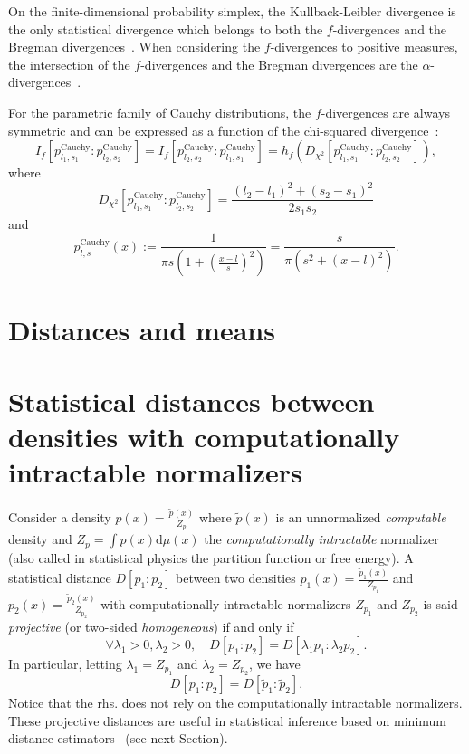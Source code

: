 \documentclass[11pt]{article}
\def\dmu{\mathrm{d}\mu}
\def\dmu{\mathrm{d}\mu}
\def\Cauchy{\mathrm{Cauchy}}
\begin{document}
On the finite-dimensional probability simplex, the Kullback-Leibler divergence is the only statistical divergence which belongs to both the $f$-divergences and the Bregman divergences~\cite{AlphaUnique-2009}. When considering the $f$-divergences to positive measures, the intersection of the $f$-divergences and the Bregman divergences are the $\alpha$-divergences~\cite{AlphaUnique-2009}. 

For the parametric family of Cauchy distributions, the $f$-divergences are always symmetric and can be expressed as a function of the chi-squared divergence~\cite{fdivCauchy-2021}:
$$
I_f[p_{l_1,s_1}^\Cauchy:p_{l_2,s_2}^\Cauchy]=I_f[p_{l_2,s_2}^\Cauchy:p_{l_1,s_1}^\Cauchy]=h_f(D_{\chi^2}[p_{l_1,s_1}^\Cauchy:p_{l_2,s_2}^\Cauchy]),
$$
where
$$
D_{\chi^2}[p_{l_1,s_1}^\Cauchy:p_{l_2,s_2}^\Cauchy]=\frac{(l_2-l_1)^2+(s_2-s_1)^2}{2s_1s_2}
$$
and
$$
p_{l,s}^\Cauchy(x) := \frac{1}{\pi s\left(1+\left(\frac{x-l}{s}\right)^2\right)}=\frac{s}{\pi (s^2+(x-l)^2)}.
$$


\section{Distances and means}



\section{Statistical distances between densities with computationally intractable normalizers}

Consider a density $p(x)=\frac{\tilde p(x)}{Z_p}$ where $\tilde p(x)$ is an unnormalized {\em computable} density 
and $Z_p=\int p(x) \dmu(x)$ the {\em computationally intractable} normalizer (also called in statistical physics the partition function or free energy).
A statistical distance $D[p_1:p_2]$ between two densities $p_1(x)=\frac{\tilde p_1(x)}{Z_{p_1}}$ and $p_2(x)=\frac{\tilde p_2(x)}{Z_{p_2}}$ with computationally intractable normalizers $Z_{p_1}$ and $Z_{p_2}$ is said {\em projective} (or two-sided {\em homogeneous}) if and only if
$$
\forall \lambda_1>0,\lambda_2>0,\quad D[p_1:p_2]=D[\lambda_1p_1:\lambda_2 p_2].
$$
In particular, letting $\lambda_1=Z_{p_1}$ and $\lambda_2=Z_{p_2}$, we have
$$
D[p_1:p_2]=D[\tilde{p}_1:\tilde{p}_2].
$$
Notice that the rhs. does not rely on the computationally intractable normalizers.
These projective distances are useful in statistical inference based on minimum distance estimators~\cite{MinDistance-2019} (see next Section).
\end{document}
